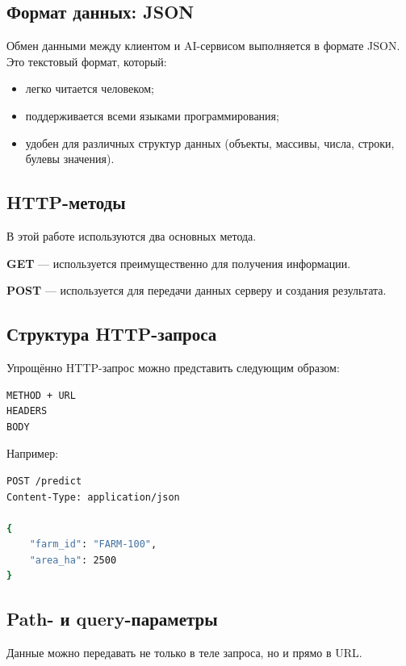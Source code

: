 \documentclass[12pt,a4paper]{article}
\begin{document}
\subsection{Формат данных: JSON}

Обмен данными между клиентом и AI-сервисом выполняется в формате JSON. Это текстовый формат, который:

\begin{itemize}
    \item легко читается человеком;
    \item поддерживается всеми языками программирования;
    \item удобен для различных структур данных (объекты, массивы, числа, строки, булевы значения).
\end{itemize}

\subsection{HTTP-методы}

В этой работе используются два основных метода.

\textbf{GET} — используется преимущественно для получения информации.

\textbf{POST} — используется для передачи данных серверу и создания результата.

\subsection{Структура HTTP-запроса}

Упрощённо HTTP-запрос можно представить следующим образом:

\begin{lstlisting}[language=bash, caption={Структура HTTP-запроса}]
METHOD + URL
HEADERS
BODY
\end{lstlisting}

Например:

\begin{lstlisting}[language=bash, caption={Пример POST-запроса}]
POST /predict
Content-Type: application/json

{
    "farm_id": "FARM-100",
    "area_ha": 2500
}
\end{lstlisting}

\subsection{Path- и query-параметры}

Данные можно передавать не только в теле запроса, но и прямо в URL.
\end{document}
